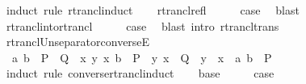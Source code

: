 \begin{isabellebody}
%
\isadelimproof
%
\endisadelimproof
%
\isatagproof
{}\isamarkupfalse%
\ {\isacharparenleft}{\kern0pt}induct\ rule{\isacharcolon}{\kern0pt}\ rtrancl{\isachardot}{\kern0pt}induct{\isacharparenright}{\kern0pt}\isanewline
\ \ \isamarkupfalse%
\ rtrancl{\isacharunderscore}{\kern0pt}refl\isanewline
\ \ \isamarkupfalse%
\ \isamarkupfalse%
\ {\isacharquery}{\kern0pt}case\ \isamarkupfalse%
\ blast\isanewline
{}\isamarkupfalse%
\isanewline
\ \ \isamarkupfalse%
\ rtrancl{\isacharunderscore}{\kern0pt}into{\isacharunderscore}{\kern0pt}rtrancl\isanewline
\ \ \isamarkupfalse%
\ \isamarkupfalse%
\ {\isacharquery}{\kern0pt}case\ \isamarkupfalse%
\ {\isacharparenleft}{\kern0pt}blast\ intro{\isacharcolon}{\kern0pt}\ rtrancl{\isacharunderscore}{\kern0pt}trans{\isacharparenright}{\kern0pt}\isanewline
{}\isamarkupfalse%
%
\endisatagproof
{\isafoldproof}%
%
\isadelimproof
\isanewline
%
\endisadelimproof
\isanewline
{}\isamarkupfalse%
\ rtrancl{\isacharunderscore}{\kern0pt}Un{\isacharunderscore}{\kern0pt}separator{\isacharunderscore}{\kern0pt}converseE{\isacharcolon}{\kern0pt}\isanewline
\ \ {\isachardoublequoteopen}{\isacharparenleft}{\kern0pt}a{\isacharcomma}{\kern0pt}\ b{\isacharparenright}{\kern0pt}\ {\isasymin}\ {\isacharparenleft}{\kern0pt}P\ {\isasymunion}\ Q{\isacharparenright}{\kern0pt}\isactrlsup {\isacharasterisk}{\kern0pt}\ {\isasymLongrightarrow}\ {\isasymforall}x\ y{\isachardot}{\kern0pt}\ {\isacharparenleft}{\kern0pt}x{\isacharcomma}{\kern0pt}\ b{\isacharparenright}{\kern0pt}\ {\isasymin}\ P\isactrlsup {\isacharasterisk}{\kern0pt}\ {\isasymlongrightarrow}\ {\isacharparenleft}{\kern0pt}y{\isacharcomma}{\kern0pt}\ x{\isacharparenright}{\kern0pt}\ {\isasymin}\ Q\ {\isasymlongrightarrow}\ y\ {\isacharequal}{\kern0pt}\ x\ {\isasymLongrightarrow}\ {\isacharparenleft}{\kern0pt}a{\isacharcomma}{\kern0pt}\ b{\isacharparenright}{\kern0pt}\ {\isasymin}\ P\isactrlsup {\isacharasterisk}{\kern0pt}{\isachardoublequoteclose}\isanewline
%
\isadelimproof
%
\endisadelimproof
%
\isatagproof
{}\isamarkupfalse%
\ {\isacharparenleft}{\kern0pt}induct\ rule{\isacharcolon}{\kern0pt}\ converse{\isacharunderscore}{\kern0pt}rtrancl{\isacharunderscore}{\kern0pt}induct{\isacharparenright}{\kern0pt}\isanewline
\ \ \isamarkupfalse%
\ base\isanewline
\ \ \isamarkupfalse%
\ \isamarkupfalse%
\ {\isacharquery}{\kern0pt}case\ \isamarkupfalse%

\end{isabellebody}
